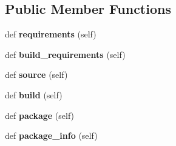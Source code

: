 \subsection*{Public Member Functions}
\begin{DoxyCompactItemize}
\item 
def {\bfseries requirements} (self)\hypertarget{classconanfile_1_1_tomato_conan_a494a7b4df997b45646bd2b0db4a1e82e}{}\label{classconanfile_1_1_tomato_conan_a494a7b4df997b45646bd2b0db4a1e82e}

\item 
def {\bfseries build\+\_\+requirements} (self)\hypertarget{classconanfile_1_1_tomato_conan_a615493b8d9b64df099ec8049067dda29}{}\label{classconanfile_1_1_tomato_conan_a615493b8d9b64df099ec8049067dda29}

\item 
def {\bfseries source} (self)\hypertarget{classconanfile_1_1_tomato_conan_a49a99296bd0b5ca80e884e800eb7c32b}{}\label{classconanfile_1_1_tomato_conan_a49a99296bd0b5ca80e884e800eb7c32b}

\item 
def {\bfseries build} (self)\hypertarget{classconanfile_1_1_tomato_conan_a7e2e46dff564879db042be1dc780f717}{}\label{classconanfile_1_1_tomato_conan_a7e2e46dff564879db042be1dc780f717}

\item 
def {\bfseries package} (self)\hypertarget{classconanfile_1_1_tomato_conan_ad62eb21cdf25bbad2ac66f7ec7db923e}{}\label{classconanfile_1_1_tomato_conan_ad62eb21cdf25bbad2ac66f7ec7db923e}

\item 
def {\bfseries package\+\_\+info} (self)\hypertarget{classconanfile_1_1_tomato_conan_ad437531b495d89edaa58a0d04bd89cc8}{}\label{classconanfile_1_1_tomato_conan_ad437531b495d89edaa58a0d04bd89cc8}

\end{DoxyCompactItemize}

